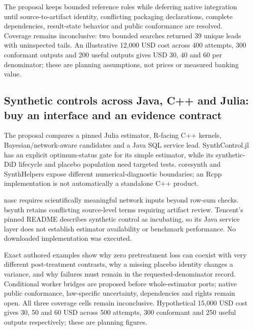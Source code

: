 The proposal keeps bounded reference roles while deferring native
integration until source-to-artifact identity, conflicting packaging
declarations, complete dependencies, result-state behavior and public
conformance are resolved. Coverage remains inconclusive: two bounded
searches returned 39 unique leads with uninspected tails. An
illustrative 12,000 USD cost across 400 attempts, 300 conformant outputs
and 200 useful outputs gives USD 30, 40 and 60 per denominator; these
are planning assumptions, not prices or measured banking value.
\citep{exec25_synthpy_choice}

\hypertarget{synthetic-controls-across-java-c-and-julia-buy-an-interface-and-an-evidence-contract}{%
\subsection{Synthetic controls across Java, C++ and Julia: buy an
interface and an evidence
contract}\label{synthetic-controls-across-java-c-and-julia-buy-an-interface-and-an-evidence-contract}}

The proposal compares a pinned Julia estimator, R-facing C++ kernels,
Bayesian/network-aware candidates and a Java SQL service lead.
SynthControl.jl has an explicit optimum-status gate for its simple
estimator, while its synthetic-DiD lifecycle and placebo population need
targeted tests. coresynth and SynthHelpers expose different
numerical-diagnostic boundaries; an Rcpp implementation is not
automatically a standalone C++ product.
\citep{exec25_synthcross_julia,exec25_synthcross_core,exec25_synthcross_helpers}

nasc requires scientifically meaningful network inputs beyond row-sum
checks. bsynth retains conflicting source-level terms requiring artifact
review. Tencent's pinned README describes synthetic control as
incubating, so its Java service layer does not establish estimator
availability or benchmark performance. No downloaded implementation was
executed.
\citep{exec25_synthcross_nasc,exec25_synthcross_bsynth,exec25_synthcross_tencent}

Exact authored examples show why zero pretreatment loss can coexist with
very different post-treatment contrasts, why a missing placebo identity
changes a variance, and why failures must remain in the
requested-denominator record. Conditional worker bridges are proposed
before whole-estimator ports; native public conformance, law-specific
uncertainty, dependencies and rights remain open. All three coverage
cells remain inconclusive. Hypothetical 15,000 USD cost gives 30, 50 and
60 USD across 500 attempts, 300 conformant and 250 useful outputs
respectively; these are planning figures.
\citep{exec25_synthcross_choice}

